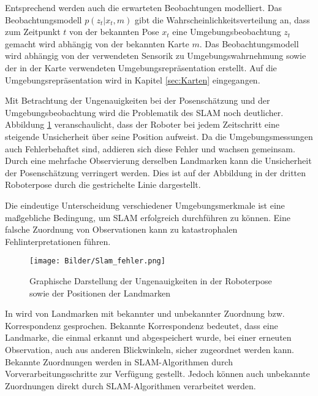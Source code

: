 Entsprechend werden auch die erwarteten Beobachtungen modelliert. Das Beobachtungsmodell $ p(z_t \vert x_t,m) $ gibt die Wahrscheinlichkeitsverteilung an, dass zum Zeitpunkt $ t $ von der bekannten Pose $ x_t $ eine Umgebungsbeobachtung $ z_t $ gemacht wird abhängig von der bekannten Karte $ m $. Das Beobachtungsmodell wird abhängig von der verwendeten Sensorik zu Umgebungswahrnehmung sowie der in der Karte verwendeten Umgebungsrepräsentation erstellt. Auf die Umgebungsrepräsentation wird in Kapitel \ref{sec:Karten} eingegangen.  	
   			
Mit Betrachtung der Ungenauigkeiten bei der Posenschätzung und der Umgebungsbeobachtung wird  die Problematik des SLAM noch deutlicher. Abbildung \ref{fig:Ungenauigkeiten} veranschaulicht, dass der Roboter bei jedem Zeitschritt eine steigende Unsicherheit über seine Position aufweist. Da die Umgebungsmessungen auch Fehlerbehaftet sind, addieren sich diese Fehler und wachsen gemeinsam. Durch eine mehrfache Observierung derselben Landmarken kann die Unsicherheit der Posenschätzung verringert werden. Dies ist auf der Abbildung in der dritten Roboterpose durch die gestrichelte Linie dargestellt. 

Die eindeutige Unterscheidung verschiedener Umgebungsmerkmale ist eine maß\-geb\-li\-che Bedingung, um SLAM erfolgreich durchführen zu können. Eine falsche Zuordnung von Observationen kann zu katastrophalen Fehlinterpretationen führen. 

\begin{figure}
\centering
\texttt{[image: Bilder/Slam\_fehler.png]}
\caption{Graphische Darstellung der Ungenauigkeiten in der Roboterpose sowie der Positionen der Landmarken }
\label{fig:Ungenauigkeiten}
\end{figure}
%
%

In \cite{thrun2005} wird von Landmarken mit bekannter und unbekannter Zuordnung bzw. Korrespondenz gesprochen. Bekannte Korrespondenz bedeutet, dass eine Landmarke, die einmal erkannt und abgespeichert wurde, bei einer erneuten Observation, auch aus anderen Blickwinkeln, sicher zugeordnet werden kann. Bekannte Zuordnungen werden in SLAM-Algorithmen durch Vorverarbeitungsschritte zur Verfügung gestellt. Jedoch können auch unbekannte Zuordnungen direkt durch SLAM-Algorithmen verarbeitet werden.


